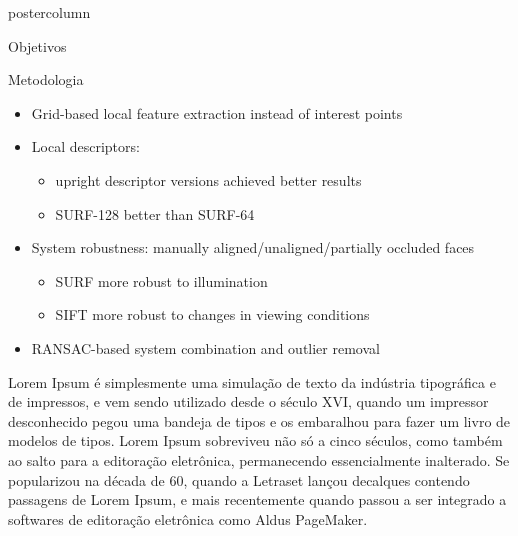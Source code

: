 \documentclass[final,hyperref={pdfpagelabels=false}]{beamer}
\begin{document}
\begin{frame}
\begin{columns}
\begin{column}{.49\textwidth}
\begin{beamercolorbox}[center,wd=\textwidth]{postercolumn}
\begin{minipage}[T]{.95\textwidth}
{\begin{block}{Objetivos}
            \end{block}
            \begin{block}{Metodologia}
              \begin{itemize}
              \item Grid-based local feature extraction instead of interest points
              \item Local descriptors:
                \begin{itemize}
                \item upright descriptor versions achieved better results
                \item SURF-128 better than SURF-64
                \end{itemize}
              \item System robustness: manually aligned/unaligned/partially occluded faces
                \begin{itemize}
                \item SURF more robust to illumination
                \item SIFT more robust to changes in viewing conditions
                \end{itemize}
              \item RANSAC-based system combination and outlier removal
              \end{itemize}
              Lorem Ipsum é simplesmente uma simulação de texto da indústria tipográfica e de impressos, e vem sendo utilizado desde o século XVI, quando um impressor desconhecido pegou uma bandeja de tipos e os embaralhou para fazer um livro de modelos de tipos. Lorem Ipsum sobreviveu não só a cinco séculos, como também ao salto para a editoração eletrônica, permanecendo essencialmente inalterado. Se popularizou na década de 60, quando a Letraset lançou decalques contendo passagens de Lorem Ipsum, e mais recentemente quando passou a ser integrado a softwares de editoração eletrônica como Aldus PageMaker.
            \end{block}
            \vfill
          }
        \end{minipage}
      \end{beamercolorbox}
    \end{column}


\end{columns}
\end{frame}
\end{document}
